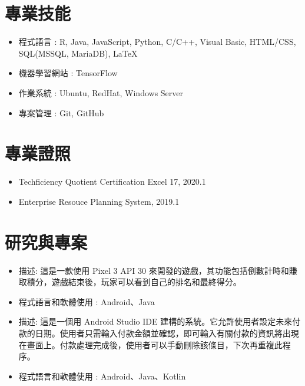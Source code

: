 \documentclass{resume}
\begin{document}
\section{專業技能}

\begin{itemize}[parsep=0.5ex]
  \item 程式語言 :  R, Java, JavaScript, Python, C/C++, Visual Basic, HTML/CSS, SQL(MSSQL, MariaDB), LaTeX
  \item 機器學習網站 : TensorFlow
  \item 作業系統 : Ubuntu, RedHat, Windows Server
  \item 專案管理 : Git, GitHub
\end{itemize}

\section{專業證照}

\begin{itemize}[parsep=0.5ex]
  \item Techficiency Quotient Certification Excel 17, 2020.1
  \item Enterprise Resouce Planning System, 2019.1
\end{itemize}

\section{研究與專案}

\begin{itemize}[parsep=0.5ex]
  \item 描述: 這是一款使用 Pixel 3 API 30 來開發的遊戲，其功能包括倒數計時和賺取積分，遊戲結束後，玩家可以看到自己的排名和最終得分。
  \item 程式語言和軟體使用 : Android、Java
\end{itemize}

\begin{itemize}[parsep=0.5ex]
  \item 描述: 這是一個用 Android Studio IDE 建構的系統。它允許使用者設定未來付款的日期。使用者只需輸入付款金額並確認，即可輸入有關付款的資訊將出現在畫面上。付款處理完成後，使用者可以手動刪除該條目，下次再重複此程序。

  \item 程式語言和軟體使用 : Android、Java、Kotlin
\end{itemize}
\end{document}
